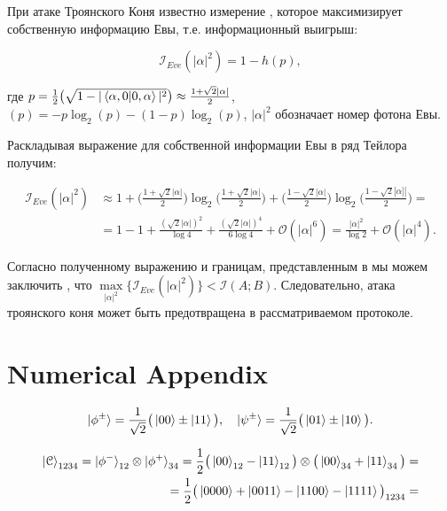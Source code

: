 \documentclass[a4paper,11pt]{article}
\begin{document}
При атаке Троянского Коня известно измерение \cite{trojan, trojan3}, которое максимизирует собственную информацию Евы, т.е. информационный выигрыш:

\begin{equation*}
\mathcal{I}_{Eve}(|\alpha|^2) = 1 - h(p),
\end{equation*}

где $p = \frac{1}{2} \big(\sqrt{1 - |\braket{\alpha, 0 | 0, \alpha}|^2 } \big) \approx \frac{1 + \sqrt2 |\alpha|}{2}$, $(p) = -p\log_2(p) - (1-p)\log_2(p)$, $|\alpha|^2$ обозначает номер фотона Евы.

Раскладывая выражение для собственной информации Евы в ряд Тейлора получим:

\begin{align*}
\mathcal{I}_{Eve}(|\alpha|^2) &\approx 1 + 
\Big( \frac{1 + \sqrt2 |\alpha|}{2} \Big) \log_2 \Big(\frac{1 + \sqrt2 |\alpha|}{2}\Big) + \Big( \frac{1 - \sqrt2 |\alpha|}{2} \Big) \log_2 \Big(\frac{1 - \sqrt2 |\alpha]|}{2}\Big) = \nonumber \\
&= 1 - 1 + \frac{(\sqrt2 |\alpha|)^2}{\log4} + \frac{(\sqrt2 |\alpha|)^4}{6\log4} + \mathcal{O}(|\alpha|^6) = \frac{|\alpha|^2}{\log2} + \mathcal{O}(|\alpha|^4).
\end{align*}

Согласно полученному выражению и границам, представленным в \cite{trojan} мы можем заключить \cite{base}, что $\max\limits_{|\alpha|^2} \big\{\mathcal{I}_{Eve} (|\alpha|^2) \big\} < \mathcal{I}(A; B)$. Следовательно, атака троянского коня может
быть предотвращена в рассматриваемом протоколе.


\section{Numerical Appendix}

\begin{equation*}
\ket{\phi^{\pm}} = \dfrac{1}{\sqrt2}\big(\ket{00} \pm \ket{11} \big), \quad
\ket{\psi^{\pm}} = \dfrac{1}{\sqrt2}\big(\ket{01} \pm \ket{10} \big).
\end{equation*}



\begin{align*}
\ket{\mathcal{C}}_{1234} = \ket{\phi^-}_{12} \otimes \ket{\phi^+}_{34}
= \dfrac{1}{2} \big(\ket{00}_{12} - \ket{11}_{12} \big) \otimes \big( \ket{00}_{34} + \ket{11}_{34} \big) = \nonumber \\
= \dfrac{1}{2} \big(\ket{0000} + \ket{0011} - \ket{1100} - \ket{1111}\big)_{1234} =
\end{align*}
\end{document}
